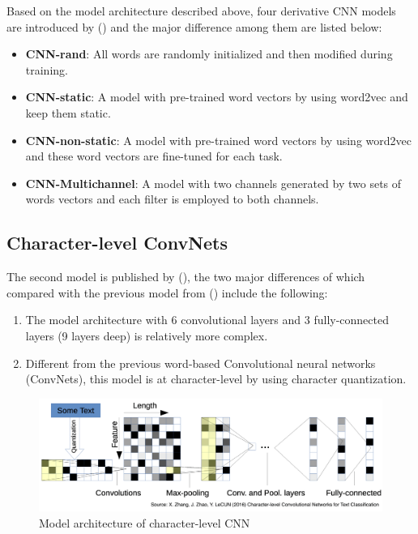 \documentclass[]{krantz}
\providecommand{\tightlist}{%
  \setlength{\itemsep}{0pt}\setlength{\parskip}{0pt}}
\begin{document}
Based on the model architecture described above, four derivative CNN models are introduced by (\citet{Kim2014ConvolutionalNN}) and the major difference among them are listed below:

\begin{itemize}
\tightlist
\item
  \textbf{CNN-rand}: All words are randomly initialized and then modified during training.
\item
  \textbf{CNN-static}: A model with pre-trained word vectors by using word2vec and keep them static.
\item
  \textbf{CNN-non-static}: A model with pre-trained word vectors by using word2vec and these word vectors are fine-tuned for each task.
\item
  \textbf{CNN-Multichannel}: A model with two channels generated by two sets of words vectors and each filter is employed to both channels.
\end{itemize}

\hypertarget{character-level-convnets}{%
\subsection{Character-level ConvNets}\label{character-level-convnets}}

The second model is published by (\citet{Zhang2015CharacterlevelCN}), the two major differences of which compared with the previous model from (\citet{Kim2014ConvolutionalNN}) include the following:

\begin{enumerate}
\def\labelenumi{\arabic{enumi}.}
\tightlist
\item
  The model architecture with 6 convolutional layers and 3 fully-connected layers (9 layers deep) is relatively more complex.
\item
  Different from the previous word-based Convolutional neural networks (ConvNets), this model is at character-level by using character quantization.
\end{enumerate}

\begin{figure}[ht]

{\centering \includegraphics[width=0.7\linewidth]{figures/01-03-cnns-and-their-applications-in-nlp/Character_level_CNN} 

}

\caption{\label{fig:fig_8} Model architecture of character-level CNN}\label{fig:figs-8}
\end{figure}
\end{document}
